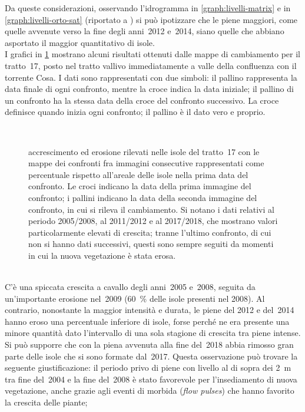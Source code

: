Da queste considerazioni, osservando l'idrogramma in \cref{graph:livelli-matrix} e in \cref{graph:livelli-orto-sat} (riportato a ) si può ipotizzare che le piene maggiori, come quelle avvenute verso la fine degli anni~2012 e~2014, siano quelle che abbiano asportato il maggior quantitativo di isole.
\\
I grafici in \cref{graph:tr-17-camb} mostrano alcuni risultati ottenuti dalle mappe di cambiamento per il tratto~17, posto nel tratto vallivo immediatamente a valle della confluenza con il torrente Cosa.
I dati sono rappresentati con due simboli: il pallino rappresenta la data finale di ogni confronto, mentre la croce indica la data iniziale; il pallino di un confronto ha la stessa data della croce del confronto successivo. 
La croce definisce quando inizia ogni confronto; il pallino è il dato vero e proprio.
%
\begin{figure}
	\centering
	
	\\
	
	\caption[cambiamenti rilevati nelle isole nel tratto~17]{accrescimento ed erosione rilevati nelle isole del tratto~17 con le mappe dei confronti fra immagini consecutive rappresentati come percentuale rispetto all'areale delle isole nella prima data del confronto.
	Le croci indicano la data della prima immagine del confronto; i pallini indicano la data della seconda immagine del confronto, in cui si rileva il cambiamento.
	Si notano i dati relativi al periodo 2005/2008, al 2011/2012 e al 2017/2018, che mostrano valori particolarmente elevati di crescita; tranne l'ultimo confronto, di cui non si hanno dati successivi, questi sono sempre seguiti da momenti in cui la nuova vegetazione è stata erosa.}
	\label{graph:tr-17-camb}
\end{figure}
%
\\
C'è una spiccata crescita a cavallo degli anni~2005 e~2008, seguita da un'importante erosione nel~2009 (\SI{60}{\percent} delle isole presenti nel 2008).
Al contrario, nonostante la maggior intensità e durata, le piene del 2012 e del~2014 hanno eroso una percentuale inferiore di isole, forse perché ne era presente una minore quantità dato l'intervallo di una sola stagione di crescita tra piene intense.
\\
Si può supporre che con la piena avvenuta alla fine del~2018 abbia rimosso gran parte delle isole che si sono formate dal~2017.
Questa osservazione può trovare la seguente giustificazione: il periodo privo di piene con livello al di sopra dei \SI{2}{\m} tra fine del~2004 e la fine del~2008 è stato favorevole per l'insediamento di nuova vegetazione, anche grazie agli eventi di morbida (\emph{flow pulses}) che hanno favorito la crescita delle piante;
